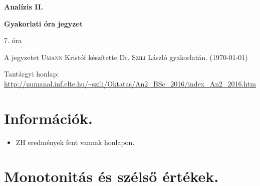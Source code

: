 \documentclass[a4paper,11.5pt]{article}
\begin{document}
	\setlength\parindent{0pt}
	\def\s{\hspace{0.2mm}\vphantom{\beta}}
	\def\Z{\mathbb{Z}}
	\def\Q{\mathbb{Q}}
	\def\R{\mathbb{R}}
	\def\C{\mathbb{C}}
	\def\N{\mathbb{N}}
	\def\Rn{\mathbb{R}^{n}}
	\def\Ra{\overline{\mathbb{R}}}
	\def\sume{\displaystyle\sum_{n=1}^{+\infty}}
	\def\sumn{\displaystyle\sum_{n=0}^{+\infty}}
	\def\biz{\emph{Bizonyítás:\ }}
	\def\narrow{\underset{n\rightarrow+\infty}{\longrightarrow}}
	\def\limn{\displaystyle\lim_{n\to +\infty}}
	\def\limx{\displaystyle\lim_{x\to +\infty}}
	
	\theoremstyle{definition}
	\newtheorem{theorem}{Tétel}[subsection] %
	
	\theoremstyle{definition}
	\newtheorem{definition}[theorem]{Definíció} %
	\newtheorem{example}[theorem]{Példa} %
	\newtheorem{task}[theorem]{Feladat} %
	\newtheorem{note}[theorem]{Megjegyzés} %
	\newtheorem{revision}[theorem]{Emlékeztető} %
	\begin{center}
		{\LARGE \textbf{Analízis II.}}
		
		{\large \textbf{Gyakorlati óra jegyzet}}
		
		7. óra
	\end{center}
	A jegyzetet \textsc{Umann} Kristóf készítette Dr. \textsc{Szili} László gyakorlatán. (\today)
	
	Tantárgyi honlap: \url{http://numanal.inf.elte.hu/~szili/Oktatas/An2_BSc_2016/index_An2_2016.htm}
	\section{Információk.}
	\begin{itemize}[$\bullet$]
		\item ZH eredmények fent vannak honlapon.
	\end{itemize}
	\section{Monotonitás és szélső értékek.}
\end{document}
